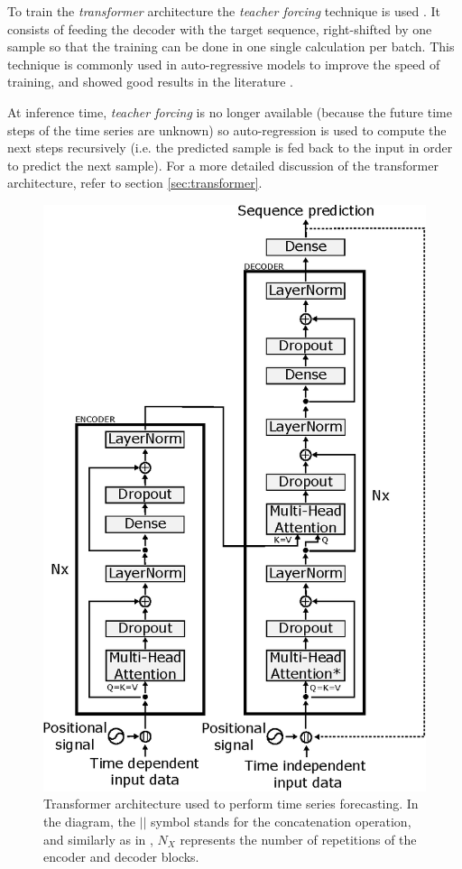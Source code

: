 To train the \textit{transformer} architecture the \textit{teacher forcing} technique is used \autocite{williams1989, Goyal2016}. It consists of feeding the decoder with the target sequence, right-shifted by one sample so that the training can be done in one single calculation per batch. This technique is commonly used in auto-regressive models to improve the speed of training, and showed good results in the literature \autocite{vaswani2017}. 

At inference time, \textit{teacher forcing} is no longer available (because the future time steps of the time series are unknown) so auto-regression is used to compute the next steps recursively (i.e. the predicted sample is fed back to the input in order to predict the next sample). For a more detailed discussion of the transformer architecture, refer to section \ref{sec:transformer}.

\begin{figure}[h!]
   	\centering
   	\includegraphics[width=0.7\linewidth]{salesforecast/images/transformer}
   	\caption[Diagram of the \textit{transformer} architecture]{Transformer architecture used to perform time series forecasting. In the diagram, the $||$ symbol stands for the concatenation operation, and similarly as in \autocite{vaswani2017}, $N_X$ represents the number of repetitions of the encoder and decoder blocks.}
   	\label{fig:salesforecast_transformer}
\end{figure}

